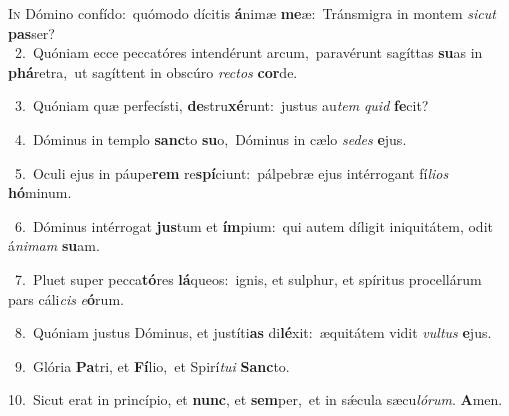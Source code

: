 \lettrine{\initial\textcolor{\initialcolor}{I}}{n} Dómino confído:~\dagger quómodo dícitis \textbf{á}\-nimæ \textbf{me}\-æ:~\star Tránsmigra in montem \textit{sic}\-\textit{ut} \textbf{pas}\-ser?\\
{\numbfont\textcolor{\numbcolor}{~2.}}~Quóniam ecce peccatóres intendérunt arcum,~\dagger paravérunt sagíttas \textbf{su}\-as in \textbf{phá}\-retra,~\star ut sagíttent in obscúro \textit{rec}\-\textit{tos} \textbf{cor}\-de.\par
{\numbfont\textcolor{\numbcolor}{~3.}}~Quóniam quæ perfecísti, \textbf{de}\-stru\-\textbf{xé}\-runt:~\star justus au\textit{tem} \textit{quid} \textbf{fe}\-cit?\par
{\numbfont\textcolor{\numbcolor}{~4.}}~Dóminus in templo \textbf{sanc}\-to \textbf{su}\-o,~\star Dóminus in cælo \textit{se}\-\textit{des} \textbf{e}\-jus.\par
{\numbfont\textcolor{\numbcolor}{~5.}}~Oculi ejus in páupe\textbf{rem} re\-\textbf{spí}\-ciunt:~\star pálpebræ ejus intérrogant fí\-\textit{li}\-\textit{os} \textbf{hó}\-minum.\par
{\numbfont\textcolor{\numbcolor}{~6.}}~Dóminus intérrogat \textbf{jus}\-tum et \textbf{ím}\-pium:~\star qui autem díligit iniquitátem, odit á\-\textit{ni}\-\textit{mam} \textbf{su}\-am.\par
{\numbfont\textcolor{\numbcolor}{~7.}}~Pluet super pecca\-\textbf{tó}\-res \textbf{lá}\-queos:~\star ignis, et sulphur, et spíritus procellárum pars cáli\textit{cis} \textit{e}\-\textbf{ó}rum.\par
{\numbfont\textcolor{\numbcolor}{~8.}}~Quóniam justus Dóminus, et justíti\textbf{as} di\-\textbf{lé}\-xit:~\star æquitátem vidit \textit{vul}\-\textit{tus} \textbf{e}\-jus.\par
{\numbfont\textcolor{\numbcolor}{~9.}}~Glória \textbf{Pa}\-tri, et \textbf{Fí}\-lio,~\star et Spirí\-\textit{tu}\-\textit{i} \textbf{Sanc}\-to.\par
{\numbfont\textcolor{\numbcolor}{10.}}~Sicut erat in princípio, et \textbf{nunc}\-, et \textbf{sem}\-per,~\star et in sǽcula sæcu\-\textit{ló}\-\textit{rum}. \textbf{A}\-men.\par
